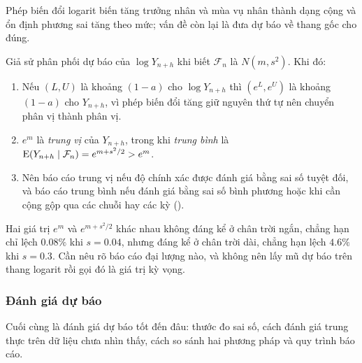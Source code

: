 Phép biến đổi logarit biến tăng trưởng nhân và mùa vụ nhân thành dạng cộng và ổn định phương sai tăng theo mức; vấn đề còn lại là đưa dự báo về thang gốc cho đúng.
\begin{kq}
Giả sử phân phối dự báo của $\log Y_{n+h}$ khi biết $\mathcal F_n$ là $N(m,s^2)$. Khi đó:
\begin{enumerate}[label=(\roman*),leftmargin=*,itemsep=1pt]
\item Nếu $(L,U)$ là khoảng $(1-a)$ cho $\log Y_{n+h}$ thì $(e^L,e^U)$ là khoảng $(1-a)$ cho $Y_{n+h}$, vì phép biến đổi tăng giữ nguyên thứ tự nên chuyển phân vị thành phân vị.
\item $e^m$ là \emph{trung vị} của $Y_{n+h}$, trong khi \emph{trung bình} là $\mathrm{E}(Y_{n+h}\mid\mathcal F_n)=e^{m+s^2/2}>e^m$.
\item Nên báo cáo trung vị nếu độ chính xác được đánh giá bằng sai số tuyệt đối, và báo cáo trung bình nếu đánh giá bằng sai số bình phương hoặc khi cần cộng gộp qua các chuỗi hay các kỳ ().
\end{enumerate}
\end{kq}
Hai giá trị $e^m$ và $e^{m+s^2/2}$ khác nhau không đáng kể ở chân trời ngắn, chẳng hạn chỉ lệch $0.08\%$ khi $s=0.04$, nhưng đáng kể ở chân trời dài, chẳng hạn lệch $4.6\%$ khi $s=0.3$. Cần nêu rõ báo cáo đại lượng nào, và không nên lấy mũ dự báo trên thang logarit rồi gọi đó là giá trị kỳ vọng.

\subsubsection{Đánh giá dự báo}

Cuối cùng là đánh giá dự báo tốt đến đâu: thước đo sai số, cách đánh giá trung thực trên dữ liệu chưa nhìn thấy, cách so sánh hai phương pháp và quy trình báo cáo.

